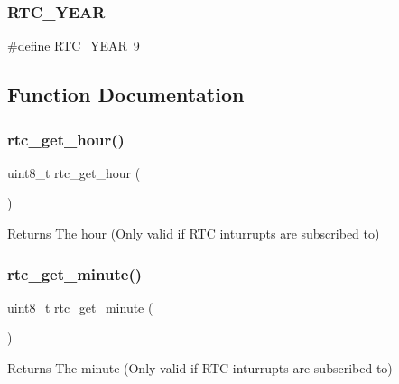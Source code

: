 \mbox{\label{group__rtc_ga1df5568e6774b73aa4c6e59fc40e9147}} 
\subsubsection{\texorpdfstring{R\+T\+C\+\_\+\+Y\+E\+AR}{RTC\_YEAR}}
{\footnotesize\ttfamily \#define R\+T\+C\+\_\+\+Y\+E\+AR~9}



\subsection{Function Documentation}
\mbox{\label{group__rtc_ga94b0c84824555e206801ea5a59eaa8fb}} 
\subsubsection{\texorpdfstring{rtc\+\_\+get\+\_\+hour()}{rtc\_get\_hour()}}
{\footnotesize\ttfamily uint8\+\_\+t rtc\+\_\+get\+\_\+hour (\begin{DoxyParamCaption}{ }\end{DoxyParamCaption})}

\begin{DoxyReturn}{Returns}
The hour (Only valid if R\+TC inturrupts are subscribed to) 
\end{DoxyReturn}
\mbox{\label{group__rtc_ga045f10751f73dcf26ec496d24332e067}} 
\subsubsection{\texorpdfstring{rtc\+\_\+get\+\_\+minute()}{rtc\_get\_minute()}}
{\footnotesize\ttfamily uint8\+\_\+t rtc\+\_\+get\+\_\+minute (\begin{DoxyParamCaption}{ }\end{DoxyParamCaption})}

\begin{DoxyReturn}{Returns}
The minute (Only valid if R\+TC inturrupts are subscribed to) 
\end{DoxyReturn}
\mbox{\label{group__rtc_ga900a6f54c5751abfa35460384278ec84}} 
